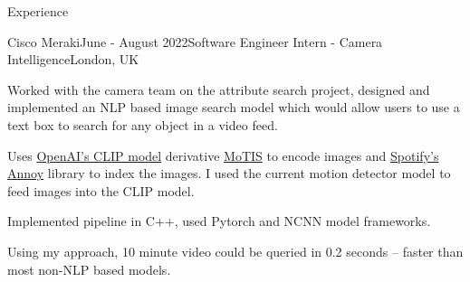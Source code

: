 \documentclass{structure}
\begin{document}
\begin{rSection}{Experience}

\begin{rSubsection}{Cisco Meraki}{June - August 2022}{Software Engineer Intern - Camera Intelligence}{London, UK}{}
    \item Worked with the camera team on the attribute search project, designed and implemented an NLP based image search model
    which would allow users to use a text box to search for any object in a video feed.
    \item Uses \href{https://openai.com/blog/clip/}{OpenAI's CLIP model} derivative \href{https://github.com/DRSY/MoTIS}{MoTIS}
    to encode images and \href{https://github.com/DRSY/MoTIS}{Spotify's Annoy} library to index the images. I used the current motion
    detector model to feed images into the CLIP model.
    \item Implemented pipeline in C++, used Pytorch and NCNN model frameworks.
    \item Using my approach, 10 minute video could be queried in 0.2 seconds -- faster than most non-NLP based models.
    \item \href{https://gist.githubusercontent.com/tom-pollak/1a2e8c1fc61ba269e25c73c02c78007c/raw/45c8cbceda8cd745d6d00cb16a09979778df663b/gistfile1.txt}{\color{blue}{Reference}}
\end{rSubsection}
\end{rSection}

\end{document}

